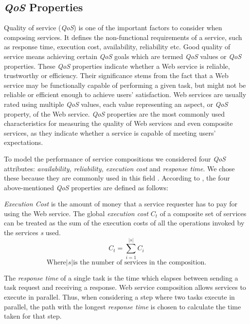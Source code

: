 \subsection{\emph{QoS} Properties}
Quality of service (\emph{QoS}) is one of the important factors to consider when composing services. It defines the non-functional requirements of a service, such as response time, execution cost, availability, reliability etc. Good quality of service means achieving certain \emph{QoS} goals which are termed \emph{QoS} values or \emph{QoS} properties. These \emph{QoS} properties indicate whether a Web service is reliable, trustworthy or efficiency. Their significance stems from the fact that a Web service may be functionally capable of performing a given task, but might not be reliable or efficient enough to achieve users' satisfaction. Web services are usually rated using multiple \emph{QoS} values, each value representing an aspect, or \emph{QoS} property, of the Web service. \emph{QoS} properties are the most commonly used characteristics for measuring the quality of Web services and even composite services, as they indicate whether a service is capable of meeting users' expectations.\par

To model the performance of service compositions we considered four \emph{QoS} attributes: \emph{availability, reliability, execution cost} and \emph{response time}. We chose these because they are commonly used in this field \cite{15,14,16,4}. According to \cite{11,4,18}, the four above-mentioned \emph{QoS} properties are defined as follows:\par

\emph{Execution Cost} is the amount of money that a service requester has to pay for using the Web service. The global \emph{execution cost} \emph{$C_t$} of a composite set of services can be treated as the sum of the execution costs of all the operations invoked by the services \emph{s} used. 
\begin{equation}
C_t = \sum_{i=1}^{|s|} C_i
\end{equation}
$$\text{Where} |s| \text{is the number of services in the composition.}$$


The \emph{response time} of a single task is the time which elapses between sending a task request and receiving a response. Web service composition allows services to execute in parallel. Thus, when considering a step where two tasks execute in parallel, the path with the longest \emph{response time} is chosen to calculate the time taken for that step.\par


